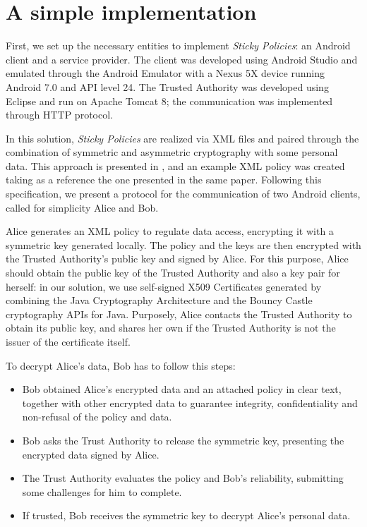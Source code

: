 \chapter{A simple implementation}
\label{chapter3}
\thispagestyle{empty}

\noindent First, we set up the necessary entities to implement \textit{Sticky Policies}: an Android client and a service provider. The client was developed using Android Studio and emulated through the Android Emulator with a Nexus 5X device running Android 7.0 and API level 24. The Trusted Authority was developed using Eclipse and run on Apache Tomcat 8; the communication was implemented through HTTP protocol.

In this solution, \textit{Sticky Policies} are realized via XML files and paired through the combination of symmetric and asymmetric cryptography with some personal data. This approach is presented in \cite{pearson2011sticky}, and an example XML policy was created taking as a reference the one presented in the same paper. Following this specification, we present a protocol for the communication of two Android clients, called for simplicity Alice and Bob. 

Alice generates an XML policy to regulate data access, encrypting it with a symmetric key generated locally. The policy and the keys are then encrypted with the Trusted Authority's public key and signed by Alice. For this purpose, Alice should obtain the public key of the Trusted Authority and also a key pair for herself: in our solution, we use self-signed X509 Certificates generated by combining the Java Cryptography Architecture and the Bouncy Castle cryptography APIs for Java. Purposely, Alice contacts the Trusted Authority to obtain its public key, and shares her own if the Trusted Authority is not the issuer of the certificate itself.

To decrypt Alice's data, Bob has to follow this steps:
\begin{itemize}
	\item Bob obtained Alice's encrypted data and an attached policy in clear text, together with other encrypted data to guarantee integrity, confidentiality and non-refusal of the policy and data.
	\item Bob asks the Trust Authority to release the symmetric key, presenting the encrypted data signed by Alice.
	\item The Trust Authority evaluates the policy and Bob's reliability, submitting some challenges for him to complete.
	\item If trusted, Bob receives the symmetric key to decrypt Alice's personal data.
\end{itemize}

